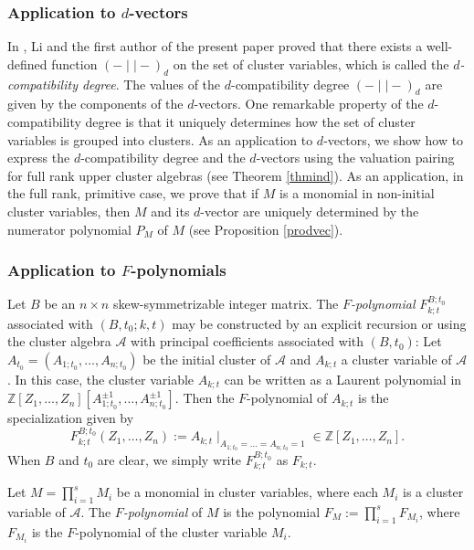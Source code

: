 \documentclass{amsart}
\theoremstyle{definition}
\theoremstyle{remark}
\numberwithin{equation}{section}
\begin{document}
\subsubsection*{Application to $d$-vectors} In \cite{CL1}, Li and the first author of the present paper proved that there exists a well-defined function $(-\mid\mid  -)_d$ on the set of cluster variables, which is called the {\em $d$-compatibility degree}. The values of the $d$-compatibility degree $(-\mid\mid  -)_d$ are given by the components of the $d$-vectors. One remarkable property of the $d$-compatibility degree
is that it uniquely determines how the set of cluster variables is grouped into clusters. As an application to $d$-vectors, we show how to express the $d$-compatibility degree and the $d$-vectors using the valuation pairing for full rank upper cluster algebras (see Theorem \ref{thmind}). As an application, in the full rank, primitive case, we prove that if $M$ is a monomial in non-initial cluster variables, then $M$ and its $d$-vector are uniquely determined by the numerator polynomial $P_M$ of $M$ (see Proposition \ref{prodvec}).

\subsubsection*{Application to $F$-polynomials}

Let $B$ be an $n\times n$ skew-symmetrizable integer matrix. The
{\em $F$-polynomial} $F_{k;t}^{B;t_0}$ associated with $(B,t_0; k,t)$ may be constructed by an explicit recursion or using the cluster
algebra $\mathcal A$ with principal coefficients \cite{FZ3} associated with $(B,t_0)$:
Let $A_{t_0}=(A_{1;t_0},\ldots,A_{n;t_0})$ be the initial cluster of $\mathcal A$ and $A_{k;t}$  a cluster variable of $\mathcal A$. In this case, the
cluster variable
$A_{k;t}$ can be written as a Laurent polynomial in $\mathbb Z[Z_1,\ldots,Z_n][A_{1;t_0}^{\pm1},\ldots,A_{n;t_0}^{\pm1}]$. Then the $F$-polynomial of $A_{k;t}$ is the specialization given by
$$F_{k;t}^{B;t_0}(Z_1,\ldots,Z_n):=A_{k;t}\mid _{A_{1;t_0}=\ldots=A_{n;t_0}=1}\in\mathbb Z[Z_1,\ldots,Z_n].$$
When $B$ and $t_0$ are clear, we simply write $F_{k;t}^{B;t_0}$ as $F_{k;t}$.

Let $M=\prod\limits_{i=1}^s M_i$ be a monomial in cluster variables, where each $M_i$ is a cluster variable of $\mathcal A$.
The {\em $F$-polynomial} of $M$ is  the polynomial
$F_M:=\prod\limits_{i=1}^sF_{M_i}$,
where $F_{M_i}$ is the $F$-polynomial of the cluster variable $M_i$.
\end{document}
